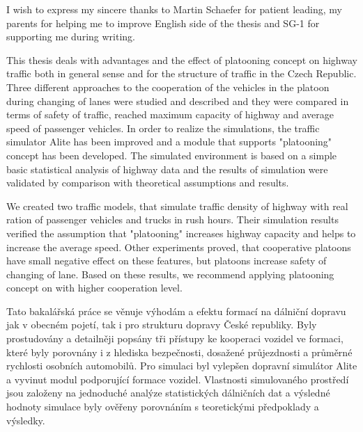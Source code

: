 \documentclass[11pt,twoside,a4paper]{book}
\begin{document}

\coverpagestarts





\acknowledgements
\noindent
I wish to express my sincere thanks to Martin Schaefer for patient leading, my parents for helping me to improve English side of the thesis and SG-1 for supporting me during writing.







 
\abstractpage

This thesis deals with advantages and the effect of platooning concept on highway traffic both in general sense and for the structure of traffic in the Czech Republic. Three different approaches to the cooperation of the vehicles in the platoon during changing of lanes were studied and described and they were compared in terms of safety of traffic, reached maximum capacity of highway and average speed of passenger vehicles. In order to realize the simulations, the traffic simulator Alite has been improved and a module that supports "platooning" concept has been developed. The simulated environment is based on a simple basic statistical analysis of highway data and the results of simulation were validated by comparison with theoretical assumptions and results. 

We created two traffic models, that simulate traffic density of highway with real ration of passenger vehicles and trucks in rush hours. Their simulation results verified the assumption that "platooning" increases highway capacity and helps to increase the average speed. Other experiments proved, that cooperative platoons have small negative effect on these features, but platoons increase safety of changing of lane. Based on these results, we recommend applying platooning concept on with higher cooperation level.


\abstractpageCZ
Tato bakalářská práce se věnuje výhodám a efektu formací na dálniční dopravu jak v obecném pojetí, tak i pro strukturu dopravy České republiky. Byly prostudovány a detailněji popsány tři přístupy ke kooperaci vozidel ve formaci, které byly porovnány i z hlediska bezpečnosti, dosažené průjezdnosti a průměrné rychlosti osobních automobilů. Pro simulaci byl vylepšen dopravní simulátor Alite a vyvinut modul podporující formace vozidel. Vlastnosti simulovaného prostředí jsou založeny na jednoduché analýze statistických dálničních dat a výsledné hodnoty simulace byly ověřeny porovnáním s teoretickými předpoklady a výsledky. 
\end{document}
